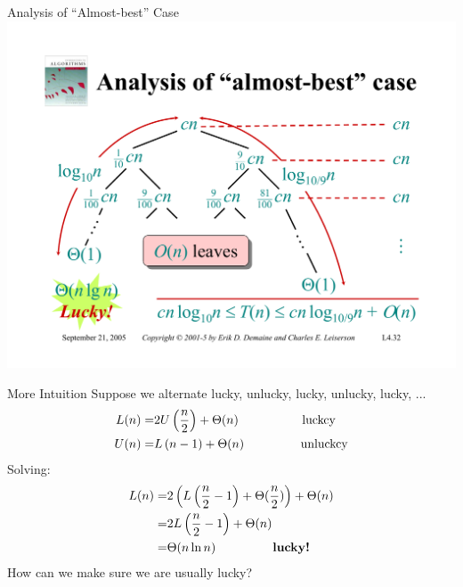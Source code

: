 \documentclass{beamer}
\begin{document}
\begin{frame}{Analysis of ``Almost-best'' Case}
    \centering
    \includegraphics[width=\textwidth, trim={1.00cm 1.50cm 1.00cm 4.25cm}, clip]{pages/lec4_32}
\end{frame}

\begin{frame}{More Intuition}
    Suppose we alternate lucky, unlucky, lucky, unlucky, lucky, ...
    \begin{equation*}
        \begin{split}
            L(n) =& 2U\left(\frac{n}{2}\right) + \Theta(n) \text{\hspace{17mm} luckcy} \\
            U(n) =& L\left(n - 1\right) + \Theta(n) \text{\hspace{15mm} unluckcy} \\
        \end{split}
    \end{equation*}
    Solving:
    \begin{equation*}
        \begin{split}
            L(n) =& 2\left(L\left(\frac{n}{2} - 1 \right) + \Theta(\frac{n}{2})\right) + \Theta(n) \\
                 =& 2L\left(\frac{n}{2} - 1 \right) + \Theta(n) \\
                 =& \Theta(n \ln n) \text{\hspace{15mm} \textbf{lucky!}}
        \end{split}
    \end{equation*}
    How can we make sure we are usually lucky?
\end{frame}
\end{document}
